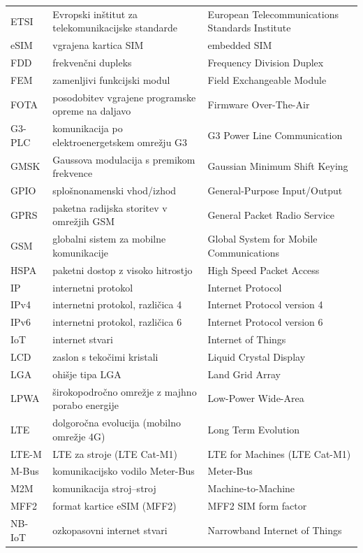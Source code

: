 \documentclass[a4paper,twoside,openright,12pt,slovene]{book}
\begin{document}
\begin{center}
\begin{longtable}{p{2.5cm}|p{5.75cm}|p{5.75cm}}
ETSI   & Evropski inštitut za telekomunikacijske standarde & European Telecommunications Standards Institute \\
eSIM   & vgrajena kartica SIM & embedded SIM \\
FDD    & frekvenčni dupleks & Frequency Division Duplex \\
FEM    & zamenljivi funkcijski modul & Field Exchangeable Module \\
FOTA   & posodobitev vgrajene programske opreme na daljavo & Firmware Over-The-Air \\
G3-PLC & komunikacija po elektroenergetskem omrežju G3 & G3 Power Line Communication \\
GMSK   & Gaussova modulacija s premikom frekvence & Gaussian Minimum Shift Keying \\
GPIO   & splošnonamenski vhod/izhod & General-Purpose Input/Output \\
GPRS   & paketna radijska storitev v omrežjih GSM & General Packet Radio Service \\
GSM    & globalni sistem za mobilne komunikacije & Global System for Mobile Communications \\
HSPA   & paketni dostop z visoko hitrostjo & High Speed Packet Access \\
IP     & internetni protokol & Internet Protocol \\
IPv4   & internetni protokol, različica 4 & Internet Protocol version 4 \\
IPv6   & internetni protokol, različica 6 & Internet Protocol version 6 \\
IoT    & internet stvari & Internet of Things \\
LCD    & zaslon s tekočimi kristali & Liquid Crystal Display \\
LGA    & ohišje tipa LGA & Land Grid Array \\
LPWA   & širokopodročno omrežje z majhno porabo energije & Low-Power Wide-Area \\
LTE    & dolgoročna evolucija (mobilno omrežje 4G) & Long Term Evolution \\
LTE-M  & LTE za stroje (LTE Cat-M1) & LTE for Machines (LTE Cat-M1) \\
M-Bus  & komunikacijsko vodilo Meter-Bus & Meter-Bus \\
M2M    & komunikacija stroj--stroj & Machine-to-Machine \\
MFF2   & format kartice eSIM (MFF2) & MFF2 SIM form factor \\
NB-IoT & ozkopasovni internet stvari & Narrowband Internet of Things \\

\end{longtable}
\end{center}
\end{document}
